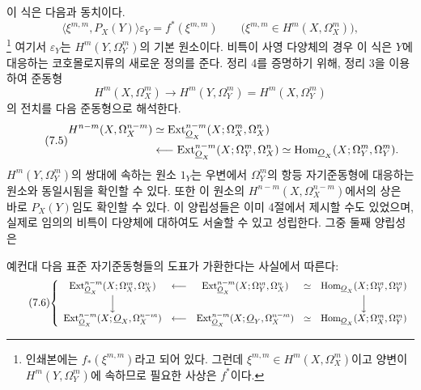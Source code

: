 이 식은 다음과 동치이다.
\begin{equation}\tag{7.4 bis}
  \bigl\langle\xi^{m,m},P_X(Y)\bigr\rangle\varepsilon_Y
  =f^{*}(\xi^{m,m})
  \qquad
  \bigl(\xi^{m,m}\in H^{m}(X,\Omega_X^{m})\bigr),
\end{equation}
\footnote{인쇄본에는 $f_{*}(\xi^{m,m})$라고 되어 있다. 그런데
$\xi^{m,m}\in H^{m}(X,\Omega_X^{m})$이고 양변이
$H^{m}(Y,\Omega_Y^{m})$에 속하므로 필요한 사상은 $f^{*}$이다.} 여기서
$\varepsilon_Y$는 $H^{m}(Y,\Omega_Y^{m})$의 기본 원소이다.
비특이 사영 다양체의 경우 이 식은 $Y$에 대응하는 코호몰로지류의 새로운
정의를 준다. 정리 4를 증명하기 위해, 정리 3을 이용하여 준동형
\[
  H^{m}(X,\Omega_X^{m})
  \longrightarrow H^{m}(Y,\Omega_Y^{m})
  =H^{m}(X,\Omega_Y^{m})
\]
의 전치를 다음 준동형으로 해석한다.
\begin{equation}\tag{7.5}
\begin{split}
  H^{n-m}(X,\Omega_X^{n-m})
  &\simeq
  \operatorname{Ext}_{\underline{O}_X}^{n-m}(X;\Omega_X^{m},\Omega_X^{n})\\
  &\longleftarrow
  \operatorname{Ext}_{\underline{O}_X}^{n-m}(X;\Omega_Y^{m},\Omega_X^{n})
  \simeq
  \operatorname{Hom}_{\underline{O}_X}(X;\Omega_Y^{m},\Omega_Y^{m}).
\end{split}
\end{equation}
$H^{m}(Y,\Omega_Y^{m})$의 쌍대에 속하는 원소 $1_Y$는 우변에서
$\Omega_Y^{m}$의 항등 자기준동형에 대응하는 원소와 동일시됨을
확인할 수 있다. 또한 이 원소의 $H^{n-m}(X,\Omega_X^{n-m})$에서의
상은 바로 $P_X(Y)$임도 확인할 수 있다. 이 양립성들은 이미 4절에서
제시할 수도 있었으며, 실제로 임의의 비특이 다양체에 대하여도
서술할 수 있고 성립한다. 그중 둘째 양립성은

예컨대 다음 표준 자기준동형들의 도표가 가환한다는 사실에서 따른다:
\begin{equation}\tag{7.6}
\resizebox{\textwidth}{!}{$
\left\{
\begin{array}{ccccc}
\operatorname{Ext}_{\Osh_X}^{n-m}(X;\Omega_X^{m},\Omega_X^{n})
&\longleftarrow&
\operatorname{Ext}_{\Osh_X}^{n-m}(X;\Omega_Y^{m},\Omega_X^{n})
&\simeq&
\operatorname{Hom}_{\Osh_X}(X;\Omega_Y^{m},\Omega_Y^{m})\\[3pt]
\Big\downarrow&&&&\Big\downarrow\\[3pt]
\operatorname{Ext}_{\Osh_X}^{n-m}(X;\Osh_X,\Omega_X^{n-m})
&\longleftarrow&
\operatorname{Ext}_{\Osh_X}^{n-m}(X;\Osh_Y,\Omega_X^{n-m})
&\simeq&
\operatorname{Hom}_{\Osh_X}(X;\Omega_X^{m},\Omega_Y^{m})
\end{array}
\right.
$}
\end{equation}

